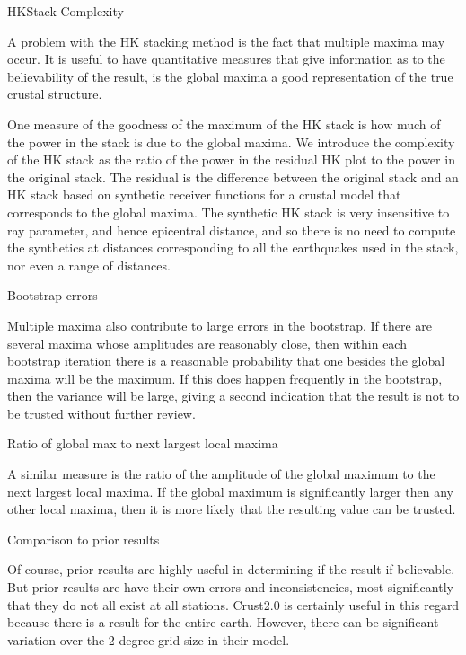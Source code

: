 
HKStack Complexity

A problem with the HK stacking method is the fact that multiple maxima may occur. It is useful to have quantitative measures that give information as to the believability of the result, is the global maxima a good representation of the true crustal structure.

One measure of the goodness of the maximum of the HK stack is how much of the power in the stack is due to the global maxima. We introduce the complexity of the HK stack as the ratio of the power in the residual HK plot to the power in the original stack. The residual is the difference between the original stack and an HK stack based on synthetic receiver functions for a crustal model that corresponds to the global maxima. The synthetic HK stack is very insensitive to ray parameter, and hence epicentral distance, and so there is no need to compute the synthetics at distances corresponding to all the earthquakes used in the stack, nor even a range of distances. 

Bootstrap errors

Multiple maxima also contribute to large errors in the bootstrap. If there are several maxima whose amplitudes are reasonably close, then within each bootstrap iteration there is a reasonable probability that one besides the global maxima will be the maximum. If this does happen frequently in the bootstrap, then the variance will be large, giving a second indication that the result is not to be trusted without further review.

Ratio of global max to next largest local maxima

A similar measure is the ratio of the amplitude of the global maximum to the next largest local maxima. If the global maximum is significantly larger then any other local maxima, then it is more likely that the resulting value can be trusted.

Comparison to prior results

Of course, prior results are highly useful in determining if the result if believable. But prior results are have their own errors and inconsistencies, most significantly that they do not all exist at all stations. Crust2.0 is certainly useful in this regard because there is a result for the entire earth. However, there can be significant variation over the 2 degree grid size in their model.

